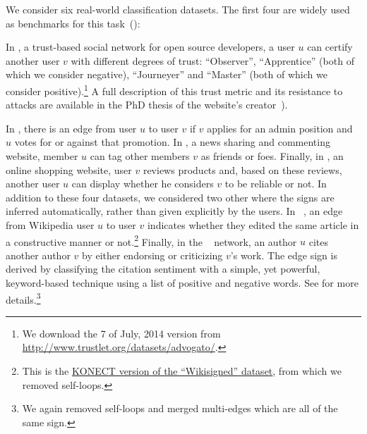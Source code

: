 We consider six real-world classification datasets. The first four are \dssn{} widely
used as benchmarks for this
task~(\eg{}\autocites{Leskovec2010}{shahriari2014ranking}{wu2016troll}{OnlineCompletion17}):
\begin{newcontent}
In \adv{}, a trust-based social network for open source developers, a user $u$ can certify another
user $v$ with different degrees of trust: \enquote{Observer}, \enquote{Apprentice} (both of which we
consider negative), \enquote{Journeyer} and \enquote{Master} (both of which we consider
positive).\footnote{We download the 7\thup{} of July, 2014 version from
\url{http://www.trustlet.org/datasets/advogato/}.} A full description of this trust metric and its
resistance to attacks are available in the PhD thesis of the website's creator~\autocite[Section
4]{AdvogatoTrustThesis02}).
\end{newcontent}
In \wik{}, there is an edge from user $u$ to user $v$ if $v$ applies for an admin position and $u$
votes for or against that promotion. In \sla{}, a news sharing and commenting website, member $u$
can tag other members $v$ as friends or foes. Finally, in \epi{}, an online shopping website, user
$v$ reviews products and, based on these reviews, another user $u$ can display whether he considers
$v$ to be reliable or not. In addition to these four datasets, we considered two other \ssn{} where
the signs are inferred automatically, rather than given explicitly by the users.  In
\kiw{}~\cite{wikiedits11}, an edge from Wikipedia user $u$ to user $v$ indicates whether they edited
the same article in a constructive manner or not.\footnote{This is the
\href{http://konect.uni-koblenz.de/networks/wikisigned-k2}{KONECT version of the
\enquote{Wikisigned} dataset}, from which we removed self-loops.} Finally, in the
\aut{}~\cite{kumar2016structure} network, an author $u$ cites another author $v$ by either endorsing
or criticizing $v$'s work. The edge sign is derived by classifying the citation sentiment with a
simple, yet powerful, keyword-based technique using a list of positive and negative words. See
\cite{kumar2016structure} for more details.\footnote{We again removed self-loops and merged
multi-edges which are all of the same sign.}

